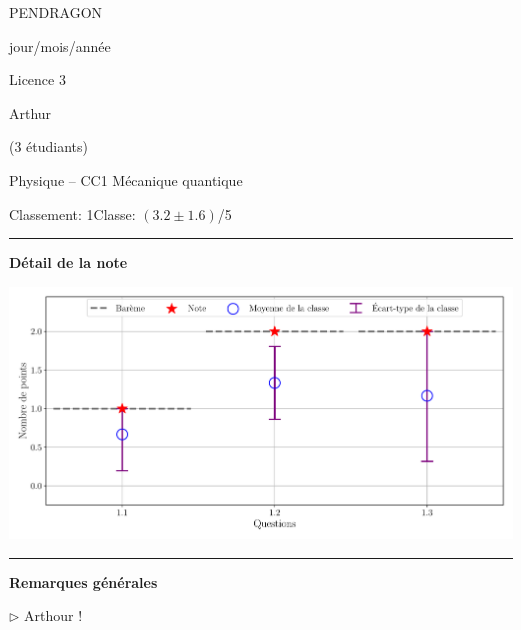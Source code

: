 \documentclass[12pt, a4paper]{article}
\begin{document}
\pagestyle{empty}
\noindent\begin{minipage}[c]{0.31\linewidth}\noindent PENDRAGON\end{minipage}\hfill
\begin{minipage}[c]{0.31\linewidth}\centering jour/mois/année \end{minipage}\hfill
\begin{minipage}[c]{0.31\linewidth}\hfill Licence 3 \end{minipage}\hfill

\noindent\begin{minipage}[c]{0.31\linewidth}\noindent Arthur\end{minipage}\hfill
\begin{minipage}[c]{0.31\linewidth}\hfill(3 étudiants)\end{minipage}
\begin{center} Physique -- CC1 Mécanique quantique\bigskip

{\Large\bf {}}\end{center}

\vspace*{-0.7cm}\noindent Classement: 1\hfill Classe:  $\left(3.2 \pm 1.6\right)$/5
\noindent\rule{\linewidth}{.7pt}\begin{center}{\large\bf Détail de la note}\end{center}

\begin{center}
\includegraphics[keepaspectratio, width=\linewidth]{./output/PENDRAGON_Arthur_GradeStats.pdf}\end{center}


\noindent\rule{\linewidth}{.7pt}\begin{center}{\large\bf Remarques générales}\end{center}

$\triangleright$\xspace Arthour !
\end{document}

